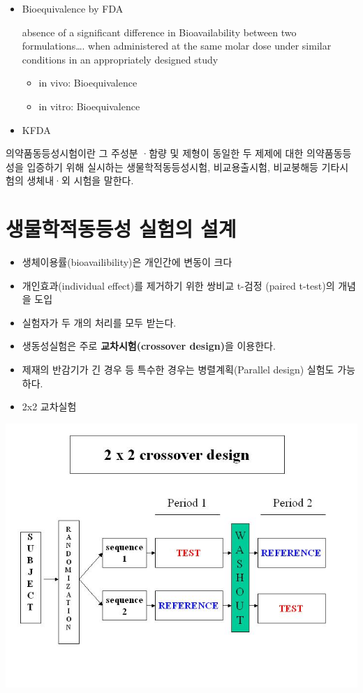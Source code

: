 \documentclass[
]{book}
\begin{document}
\begin{itemize}
\item
  Bioequivalence by FDA

  absence of a significant difference in Bioavailability between two formulations\ldots. when administered at the same molar dose under similar conditions in an appropriately designed study

  \begin{itemize}
  \item
    in vivo: Bioequivalence
  \item
    in vitro: Bioequivalence
  \end{itemize}
\item
  KFDA
\end{itemize}

의약품동등성시험이란 그 주성분 ·함량 및 제형이 동일한 두 제제에 대한 의약품동등성을 입증하기 위해 실시하는
생물학적동등성시험, 비교용출시험, 비교붕해등 기타시험의 생체내·외 시험을 말한다.

\hypertarget{uxc0dduxbb3cuxd559uxc801uxb3d9uxb4f1uxc131-uxc2e4uxd5d8uxc758-uxc124uxacc4}{%
\section{생물학적동등성 실험의 설계}\label{uxc0dduxbb3cuxd559uxc801uxb3d9uxb4f1uxc131-uxc2e4uxd5d8uxc758-uxc124uxacc4}}

\begin{itemize}
\item
  생체이용률(bioavailibility)은 개인간에 변동이 크다
\item
  개인효과(individual effect)를 제거하기 위한 쌍비교 t-검정 (paired t-test)의 개념을 도입
\item
  실험자가 두 개의 처리를 모두 받는다.
\item
  생동성실험은 주로 \textbf{교차시험(crossover design)}을 이용한다.
\item
  제재의 반감기가 긴 경우 등 특수한 경우는 병렬계획(Parallel design) 실험도 가능하다.
\item
  2x2 교차실험
\end{itemize}

\includegraphics{design22.jpg}
\end{document}
